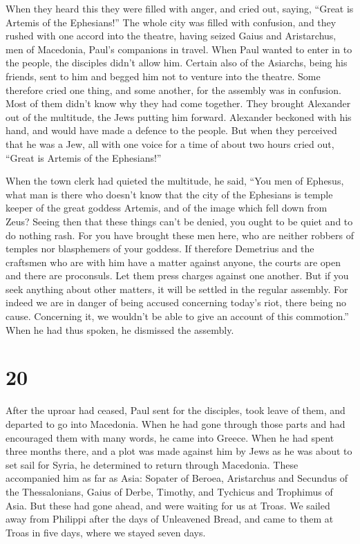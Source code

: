  When they heard this they were filled with anger, and
cried out, saying, ``Great is Artemis of the Ephesians!''
 The whole city was filled with confusion, and they
rushed with one accord into the theatre, having seized Gaius and
Aristarchus, men of Macedonia, Paul's companions in travel.
 When Paul wanted to enter in to the people, the
disciples didn't allow him.  Certain also of the
Asiarchs, being his friends, sent to him and begged him not to venture
into the theatre.  Some therefore cried one thing, and
some another, for the assembly was in confusion. Most of them didn't
know why they had come together.  They brought Alexander
out of the multitude, the Jews putting him forward. Alexander beckoned
with his hand, and would have made a defence to the people.
 But when they perceived that he was a Jew, all with one
voice for a time of about two hours cried out, ``Great is Artemis of the
Ephesians!''

 When the town clerk had quieted the multitude, he said,
``You men of Ephesus, what man is there who doesn't know that the city
of the Ephesians is temple keeper of the great goddess Artemis, and of
the image which fell down from Zeus?  Seeing then that
these things can't be denied, you ought to be quiet and to do nothing
rash.  For you have brought these men here, who are
neither robbers of temples nor blasphemers of your goddess.
 If therefore Demetrius and the craftsmen who are with
him have a matter against anyone, the courts are open and there are
proconsuls. Let them press charges against one another. 
But if you seek anything about other matters, it will be settled in the
regular assembly.  For indeed we are in danger of being
accused concerning today's riot, there being no cause. Concerning it, we
wouldn't be able to give an account of this commotion.'' 
When he had thus spoken, he dismissed the assembly.

\hypertarget{section-19}{%
\section{20}\label{section-19}}

 After the uproar had ceased, Paul sent for the disciples,
took leave of them, and departed to go into Macedonia. 
When he had gone through those parts and had encouraged them with many
words, he came into Greece.  When he had spent three
months there, and a plot was made against him by Jews as he was about to
set sail for Syria, he determined to return through Macedonia.
 These accompanied him as far as Asia: Sopater of Beroea,
Aristarchus and Secundus of the Thessalonians, Gaius of Derbe, Timothy,
and Tychicus and Trophimus of Asia.  But these had gone
ahead, and were waiting for us at Troas.  We sailed away
from Philippi after the days of Unleavened Bread, and came to them at
Troas in five days, where we stayed seven days.

